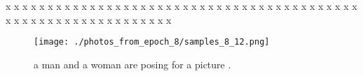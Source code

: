 \documentclass{article}%
\begin{document}
x\newline%
x\newline%
x\newline%
x\newline%
x\newline%
x\newline%
x\newline%
x\newline%
x\newline%
x\newline%
x\newline%
x\newline%
x\newline%
x\newline%
x\newline%
x\newline%
x\newline%
x\newline%
x\newline%
x\newline%
x\newline%
x\newline%
x\newline%
x\newline%
x\newline%
x\newline%
x\newline%
x\newline%
x\newline%
x\newline%
x\newline%
x\newline%
x\newline%
x\newline%
x\newline%
x\newline%
x\newline%
x\newline%
x\newline%
x\newline%
x\newline%
x\newline%
x\newline%
x\newline%
x\newline%
x\newline%
x\newline%
x\newline%
x\newline%
x\newline%
x\newline%
x\newline%
x\newline%
x\newline%
x\newline%
x\newline%
x\newline%
x\newline%
x\newline%
x\newline%
x\newline%
x

%


\begin{figure}[h!]%
\centering%
\texttt{[image: ./photos\_from\_epoch\_8/samples\_8\_12.png]}%
\caption{a man and a woman are posing for a picture .}%
\end{figure}

%
\end{document}
